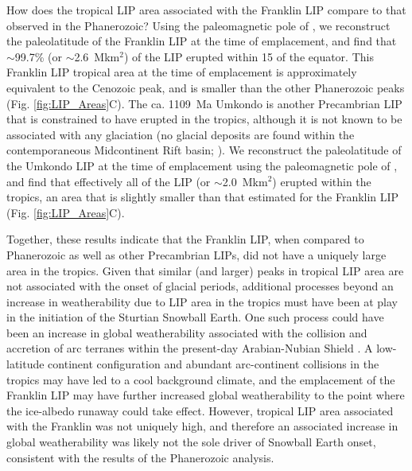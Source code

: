 \documentclass[11pt,letterpaper]{article}
\begin{document}
How does the tropical LIP area associated with the Franklin LIP compare to that observed in the Phanerozoic? Using the paleomagnetic pole of \citet{Denyszyn2009a}, we reconstruct the paleolatitude of the Franklin LIP at the time of emplacement, and find that $\sim$99.7\% (or $\sim$2.6~Mkm$^{2}$) of the LIP erupted within 15\textdegree\xspace of the equator. This Franklin LIP tropical area at the time of emplacement is approximately equivalent to the Cenozoic peak, and is smaller than the other Phanerozoic peaks (Fig. \ref{fig:LIP_Areas}C). The ca. 1109~Ma Umkondo is another Precambrian LIP that is constrained to have erupted in the tropics, although it is not known to be associated with any glaciation (no glacial deposits are found within the contemporaneous Midcontinent Rift basin; \citealp{Swanson-Hysell2019a}). We reconstruct the paleolatitude of the Umkondo LIP at the time of emplacement using the paleomagnetic pole of \citet{Swanson-Hysell2015b}, and find that effectively all of the LIP (or $\sim$2.0~Mkm$^{2}$) erupted within the tropics, an area that is slightly smaller than that estimated for the Franklin LIP (Fig. \ref{fig:LIP_Areas}C).

Together, these results indicate that the Franklin LIP, when compared to Phanerozoic as well as other Precambrian LIPs, did not have a uniquely large area in the tropics. Given that similar (and larger) peaks in tropical LIP area are not associated with the onset of glacial periods, additional processes beyond an increase in weatherability due to LIP area in the tropics must have been at play in the initiation of the Sturtian Snowball Earth. One such process could have been an increase in global weatherability associated with the collision and accretion of arc terranes within the present-day Arabian-Nubian Shield \citep{Park2018a}. A low-latitude continent configuration and abundant arc-continent collisions in the tropics may have led to a cool background climate, and the emplacement of the Franklin LIP may have further increased global weatherability to the point where the ice-albedo runaway could take effect. However, tropical LIP area associated with the Franklin was not uniquely high, and therefore an associated increase in global weatherability was likely not the sole driver of Snowball Earth onset, consistent with the results of the Phanerozoic analysis.
\end{document}
